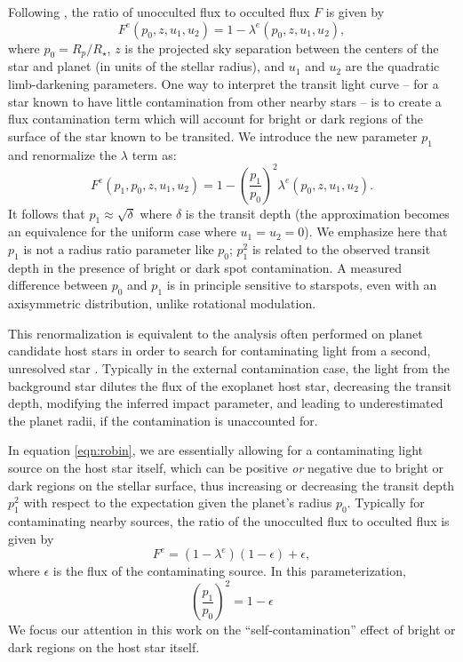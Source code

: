 Following \citet{Mandel2002}, the ratio of unocculted flux to occulted flux $F$ is given by 
\begin{equation}
F^e(p_0,z,u_1,u_2) = 1-\lambda^e(p_0,z,u_1,u_2),
\end{equation}
where $p_0 = R_p/R_\star$, $z$ is the projected sky separation between the centers of the star and planet (in units of the stellar radius), and $u_1$ and $u_2$ are the quadratic limb-darkening parameters. One way to interpret the transit light curve -- for a star known to have little contamination from other nearby stars -- is to create a flux contamination term which will account for bright or dark regions of the surface of the star known to be transited. We introduce the new parameter $p_1$ and renormalize the $\lambda$ term as:
\begin{equation} \label{eqn:robin}
F^e(p_1,p_0,z,u_1,u_2)= 1-\left(\frac{p_1}{p_0}\right)^2 \lambda^e(p_0,z,u_1,u_2).
\end{equation}
It follows that $p_1 \approx \sqrt{\delta}$ where $\delta$ is the transit depth (the approximation becomes an equivalence for the uniform case where $u_1=u_2=0$). We emphasize here that $p_1$ is not a radius ratio parameter like $p_0$; $p_1^2$ is related to the observed transit depth in the presence of bright or dark spot contamination. A measured difference between $p_0$ and $p_1$ is in principle sensitive to starspots, even with an axisymmetric distribution, unlike rotational modulation.

This renormalization is equivalent to the analysis often performed on \kepler planet candidate host stars in order to search for contaminating light from a second, unresolved star \citep{Torres2011,Morton2012,Teske2018}. Typically in the external contamination case, the light from the background star dilutes the flux of the exoplanet host star, decreasing the transit depth, modifying the inferred impact parameter, and leading to underestimated the planet radii, if the contamination is unaccounted for.

In equation \ref{eqn:robin}, we are essentially allowing for a contaminating light source on the host star itself, which can be positive \textit{or} negative due to bright or dark regions on the stellar surface, thus increasing or decreasing the transit depth $p_1^2$ with respect to the expectation given the planet's radius $p_0$. Typically for contaminating nearby sources, the ratio of the unocculted flux to occulted flux is given by 
\begin{equation}
F^e = (1 - \lambda^e)(1 - \epsilon) + \epsilon,
\end{equation}
where $\epsilon$ is the flux of the contaminating source. In this parameterization, 
\begin{equation}
\left( \frac{p_1}{p_0}\right)^2 = 1 - \epsilon
\end{equation}
We focus our attention in this work on the ``self-contamination'' effect of bright or dark regions on the host star itself. 

